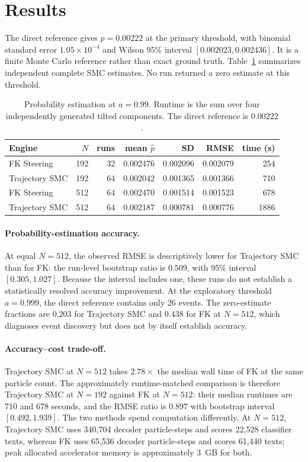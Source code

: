 \documentclass{article}
\begin{document}
\section{Results}
\label{sec:results}

The direct reference gives $p=0.00222$ at the primary threshold, with binomial
standard error $1.05\times10^{-4}$ and Wilson 95\% interval
$[0.002023,0.002436]$. It is a finite Monte Carlo reference rather than exact
ground truth. Table~\ref{tab:main-results} summarizes independent complete SMC
estimates. No run returned a zero estimate at this threshold.

\begin{table}[ht]
\caption{Probability estimation at $a=0.99$. Runtime is the sum over four
independently generated tilted components. The direct reference is $0.00222$.}
\label{tab:main-results}
\centering
\small
\begin{tabular}{lrrrrrr}
\toprule
Engine & $N$ & runs & mean $\widehat p$ & SD & RMSE & time (s) \\
\midrule
FK Steering   & 192 & 32 & 0.002476 & 0.002096 & 0.002079 & 254 \\
Trajectory SMC & 192 & 64 & 0.002042 & 0.001365 & 0.001366 & 710 \\
FK Steering   & 512 & 64 & 0.002470 & 0.001514 & 0.001523 & 678 \\
Trajectory SMC & 512 & 64 & 0.002187 & 0.000781 & 0.000776 & 1886 \\
\bottomrule
\end{tabular}
\end{table}

\paragraph{Probability-estimation accuracy.}
At equal $N=512$, the observed RMSE is descriptively lower for Trajectory SMC
than for FK: the run-level bootstrap ratio is $0.509$, with 95\% interval
$[0.305,1.027]$. Because the interval includes one, these runs do not establish
a statistically resolved accuracy improvement. At the
exploratory threshold $a=0.999$, the direct reference contains only 26 events.
The zero-estimate fractions are $0.203$ for Trajectory SMC and $0.438$ for FK at
$N=512$, which diagnoses event discovery but does not by itself establish
accuracy.

\paragraph{Accuracy--cost trade-off.}
Trajectory SMC at $N=512$ takes $2.78\times$ the median wall time of FK at the
same particle count. The approximately runtime-matched comparison is therefore
Trajectory SMC at $N=192$ against FK at $N=512$: their median runtimes are 710
and 678 seconds, and the RMSE ratio is $0.897$ with bootstrap interval
$[0.492,1.939]$. The two methods spend computation differently. At $N=512$,
Trajectory SMC uses 340,704 decoder particle-steps and scores 22,528 classifier
texts, whereas FK uses 65,536 decoder particle-steps and scores 61,440 texts;
peak allocated accelerator memory is approximately 3~GB for both.
\end{document}
